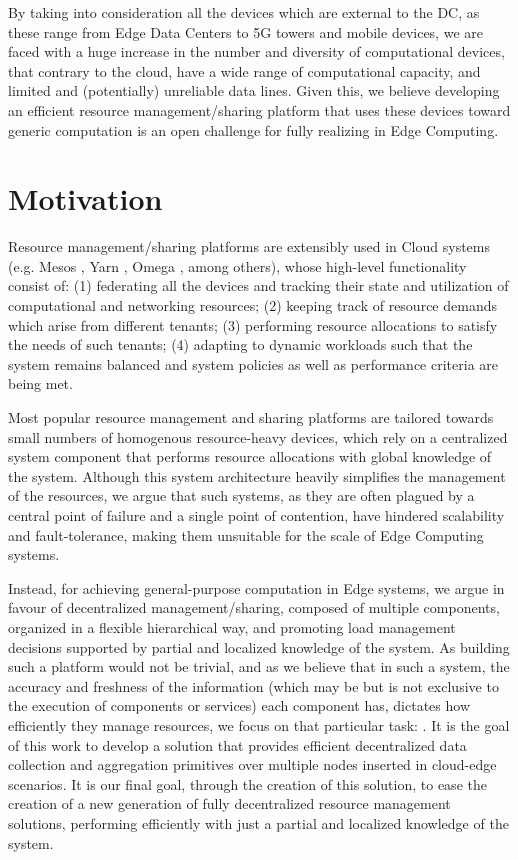 By taking into consideration all the devices which are external to the DC, as these range from Edge Data Centers to 5G towers and mobile devices, we are faced with a huge increase in the number and diversity of computational devices, that contrary to the cloud, have a wide range of computational capacity, and limited and (potentially) unreliable data lines. Given this, we believe developing an efficient resource management/sharing platform that uses these devices toward generic computation is an open challenge for fully realizing in Edge Computing.

\section{Motivation}

Resource management/sharing platforms are extensibly used in Cloud systems (e.g. Mesos \cite{hindman2011mesos}, Yarn \cite{Vavilapalli2013ApacheHY}, Omega \cite{41684}, among others), whose high-level functionality consist of: (1) federating all the devices and tracking their state and utilization of computational and networking resources; (2) keeping track of resource demands which arise from different tenants; (3) performing resource allocations to satisfy the needs of such tenants; (4) adapting to dynamic workloads such that the system remains balanced and system policies as well as performance criteria are being met.

Most popular resource management and sharing platforms are tailored towards small numbers of homogenous resource-heavy devices, which rely on a centralized system component that performs resource allocations with global knowledge of the system. Although this system architecture heavily simplifies the management of the resources, we argue that such systems, as they are often plagued by a central point of failure and a single point of contention, have hindered scalability and fault-tolerance, making them unsuitable for the scale of Edge Computing systems. 

Instead, for achieving general-purpose computation in Edge systems, we argue in favour of decentralized management/sharing, composed of multiple components, organized in a flexible hierarchical way, and promoting load management decisions supported by partial and localized knowledge of the system. As building such a platform would not be trivial, and as we believe that in such a system, the accuracy and freshness of the information (which may be but is not exclusive to the execution of components or services) each component has, dictates how efficiently they manage resources, we focus on that particular task: . It is the goal of this work to develop a solution that provides efficient decentralized data collection and aggregation primitives over multiple nodes inserted in cloud-edge scenarios. It is our final goal, through the creation of this solution, to ease the creation of a new generation of fully decentralized resource management solutions, performing efficiently with just a partial and localized knowledge of the system.

